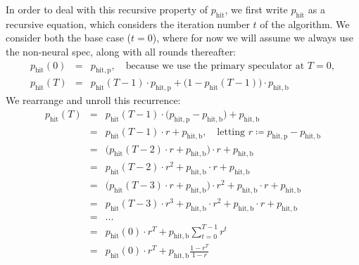 \noindent In order to deal with this recursive property of $p_{\mathrm{hit}}$, we first write $p_{\mathrm{hit}}$ as a recursive equation, which considers the iteration number $t$ of the algorithm. We consider both the base case ($t=0$), where for now we will assume we always use the non-neural spec, along with all rounds thereafter:
\begin{eqnarray*}
p_{\mathrm{hit}}(0) &=& p_{\mathrm{hit,p}}, \quad \text{because we use the primary speculator at } T=0, \\
p_{\mathrm{hit}}(T) &=& p_{\mathrm{hit}}(T-1) \cdot p_{\mathrm{hit,p}} + \Big(1 - p_{\mathrm{hit}}(T-1) \Big) \cdot p_{\mathrm{hit,b}}
\end{eqnarray*}
We rearrange and unroll this recurrence:
\begin{eqnarray*}
p_{\mathrm{hit}}(T) &=& p_{\mathrm{hit}}(T-1)\cdot \Big(p_{\mathrm{hit,p}} - p_{\mathrm{hit,b}}\Big) +  p_{\mathrm{hit,b}}\\
&=& p_{\mathrm{hit}}(T-1)\cdot r + p_{\mathrm{hit,b}}, \quad \text{letting } r \coloneqq p_{\mathrm{hit,p}} - p_{\mathrm{hit,b}}\\
&=& \Big(p_{\mathrm{hit}}(T-2)\cdot r + p_{\mathrm{hit,b}}\Big)\cdot r + p_{\mathrm{hit,b}} \\
&=& p_{\mathrm{hit}}(T-2)\cdot r^2 + p_{\mathrm{hit,b}}\cdot r + p_{\mathrm{hit,b}} \\
&=& \Big(p_{\mathrm{hit}}(T-3)\cdot r + p_{\mathrm{hit,b}}\Big)\cdot r^2 + p_{\mathrm{hit,b}}\cdot r + p_{\mathrm{hit,b}} \\
&=& p_{\mathrm{hit}}(T-3)\cdot r^3 + p_{\mathrm{hit,b}}\cdot r^2 + p_{\mathrm{hit,b}}\cdot r + p_{\mathrm{hit,b}} \\
&=& \ldots \\
&=& p_{\mathrm{hit}}(0)\cdot r^T + p_{\mathrm{hit,b}} \sum_{t=0}^{T-1} r^t \\
&=& p_{\mathrm{hit}}(0)\cdot r^T + p_{\mathrm{hit,b}} \frac{1-r^T}{1-r}
\end{eqnarray*}
